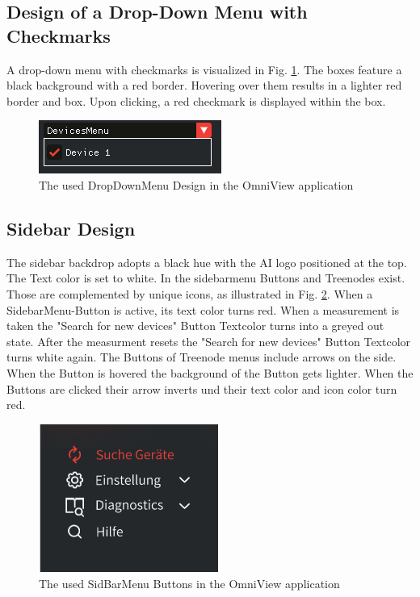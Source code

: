 \documentclass{scrreprt}
\begin{document}
\subsection{Design of a Drop-Down Menu with Checkmarks}\label{cap:Designprinciples_dropDownMenusWithCheckmark}

A drop-down menu with checkmarks is visualized in Fig. \ref{fig: DragandDropwithCheckmarks}. The boxes feature a black background with a red border. Hovering over them results in a lighter red border and box. Upon clicking, a red checkmark is displayed within the box.

\begin{figure}
    \includegraphics[width=.5\textwidth]{assets/pictures/DropDownMenu.png}
    \caption[]{The used DropDownMenu Design in the OmniView application}
    \label{fig: DragandDropwithCheckmarks}
\end{figure}

\subsection{Sidebar Design}\label{cap: SideBarDesignMenu}

The sidebar backdrop adopts a black hue with the AI logo positioned at the top. The Text color is set to white. In the sidebarmenu Buttons and Treenodes exist. Those are complemented by unique icons, as illustrated in Fig. \ref{fig: SideMenuIcons}.
When a SidebarMenu-Button is active, its text color turns red. 
When a measurement is taken the "Search for new devices" Button Textcolor turns into a greyed out state. After the measurment resets the "Search for new devices" Button Textcolor turns white again.
The Buttons of Treenode menus include arrows on the side. When the Button is hovered the background of the Button gets lighter. When the Buttons are clicked their arrow inverts und their text color and icon color turn red. 

\begin{figure}
    \includegraphics[width=.4\textwidth]{assets/pictures/SideBarMenuButtons.png}
    \caption[]{The used SidBarMenu Buttons in the OmniView application}
    \label{fig: SideMenuIcons}
\end{figure}
\end{document}
